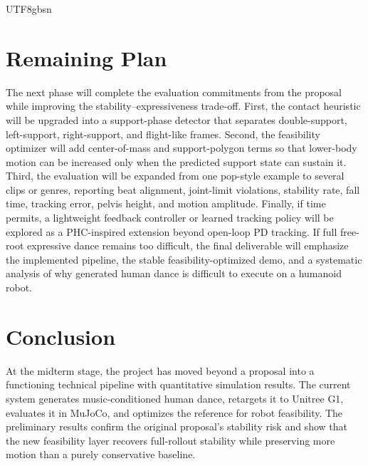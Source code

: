 \documentclass[conference]{IEEEtran}
\begin{document}
\begin{CJK*}{UTF8}{gbsn}
\section{Remaining Plan}
The next phase will complete the evaluation commitments from the proposal while improving the stability--expressiveness trade-off. First, the contact heuristic will be upgraded into a support-phase detector that separates double-support, left-support, right-support, and flight-like frames. Second, the feasibility optimizer will add center-of-mass and support-polygon terms so that lower-body motion can be increased only when the predicted support state can sustain it. Third, the evaluation will be expanded from one pop-style example to several clips or genres, reporting beat alignment, joint-limit violations, stability rate, fall time, tracking error, pelvis height, and motion amplitude. Finally, if time permits, a lightweight feedback controller or learned tracking policy will be explored as a PHC-inspired extension beyond open-loop PD tracking. If full free-root expressive dance remains too difficult, the final deliverable will emphasize the implemented pipeline, the stable feasibility-optimized demo, and a systematic analysis of why generated human dance is difficult to execute on a humanoid robot.

\section{Conclusion}
At the midterm stage, the project has moved beyond a proposal into a functioning technical pipeline with quantitative simulation results. The current system generates music-conditioned human dance, retargets it to Unitree G1, evaluates it in MuJoCo, and optimizes the reference for robot feasibility. The preliminary results confirm the original proposal's stability risk and show that the new feasibility layer recovers full-rollout stability while preserving more motion than a purely conservative baseline.




\end{CJK*}
\end{document}
